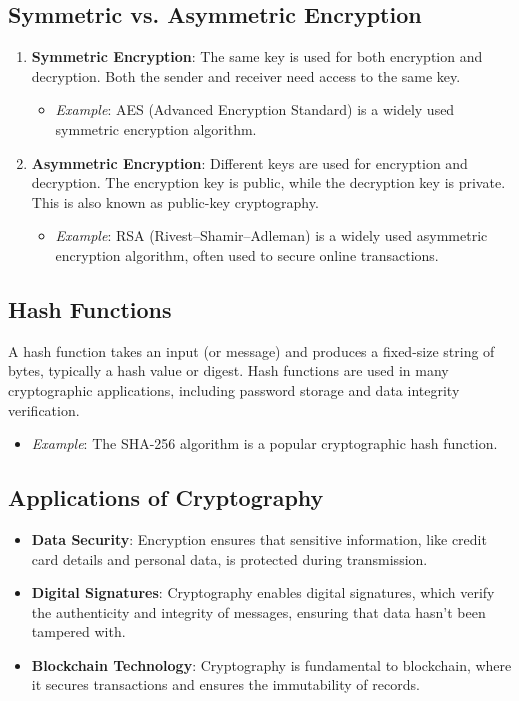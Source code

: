 \subsection{Symmetric vs. Asymmetric Encryption}
\begin{enumerate}
    \item \textbf{Symmetric Encryption}: The same key is used for both encryption and decryption. Both the sender and receiver need access to the same key.
    \begin{itemize}
        \item \textit{Example}: AES (Advanced Encryption Standard) is a widely used symmetric encryption algorithm.
    \end{itemize}
    \item \textbf{Asymmetric Encryption}: Different keys are used for encryption and decryption. The encryption key is public, while the decryption key is private. This is also known as public-key cryptography.
    \begin{itemize}
        \item \textit{Example}: RSA (Rivest–Shamir–Adleman) is a widely used asymmetric encryption algorithm, often used to secure online transactions.
    \end{itemize}
\end{enumerate}

\subsection{Hash Functions}
A hash function takes an input (or message) and produces a fixed-size string of bytes, typically a hash value or digest. Hash functions are used in many cryptographic applications, including password storage and data integrity verification.
\begin{itemize}
    \item \textit{Example}: The SHA-256 algorithm is a popular cryptographic hash function.
\end{itemize}

\subsection{Applications of Cryptography}
\begin{itemize}
    \item \textbf{Data Security}: Encryption ensures that sensitive information, like credit card details and personal data, is protected during transmission.
    \item \textbf{Digital Signatures}: Cryptography enables digital signatures, which verify the authenticity and integrity of messages, ensuring that data hasn’t been tampered with.
    \item \textbf{Blockchain Technology}: Cryptography is fundamental to blockchain, where it secures transactions and ensures the immutability of records.
\end{itemize}

